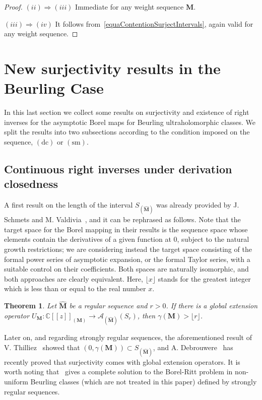 \documentclass[11pt,a4paper]{article}
\theoremstyle{plain}
\newtheorem{theorem}{Theorem}[section]
\theoremstyle{definition}
\numberwithin{equation}{section}
\newcommand{\CC}{\mathbb{C}}
\newcommand{\M}{{\boldsymbol{M}}}
\newcommand{\hM}{\widehat{{\boldsymbol{M}}}}
\def\ga{\gamma}
\newcommand{\dc}{\operatorname{(dc)}}
\newcommand{\sm}{\operatorname{(sm)}}
\begin{document}
\begin{proof}
	$(ii)\Rightarrow (iii)$ Immediate for any weight sequence $\M$.
	
	$(iii)\Rightarrow (iv)$ It follows from~\eqref{equaContentionSurjectIntervals}, again valid for any weight sequence.
\end{proof}

\section{New surjectivity results in the Beurling Case}\label{sect.Improvements.Beurling}

In this last section we collect some results on surjectivity and existence of right inverses for the asymptotic Borel maps for Beurling ultraholomorphic classes. We split the results into two subsections according to the condition imposed on the sequence, $\dc$ or $\sm$.

\subsection{Continuous right inverses under derivation closedness}

A first result on the length of the interval $S_{(\hM)}$ was already provided by J. Schmets and M. Valdivia~\cite[Th. 4.4 and 4.6]{SchmetsValdivia00}, and it can be rephrased as follows.
Note that the target space for the Borel mapping in their results is the sequence space whose elements contain the derivatives of a given function at 0, subject to the natural growth restrictions; we are considering instead the target space consisting of the formal power series of asymptotic expansion, or the formal Taylor series, with a suitable control on their coefficients. Both spaces are naturally isomorphic, and both approaches are clearly equivalent.
Here, $\lfloor x\rfloor$ stands for the greatest integer which is less than or equal to the real number $x$.

\begin{theorem}\label{th.SchmVald.ext.oper.Beurling.implies.gamma}
Let $\hM$ be a regular sequence and $r>0$. If there is a global extension operator $U_{\M}:\CC[[z]]_{(\M)}\to\mathcal{A}_{(\hM)}(S_{r})$, then $\gamma(\M)>\lfloor r\rfloor$.
\end{theorem}

Later on, and regarding strongly regular sequences, the aforementioned result of V. Thilliez~\cite[Cor. 3.4.1]{Thilliez03} showed that $(0,\ga(\M))\subset S_{(\hM)}$, and A. Debrouwere~\cite[Cor. 1.3]{DebrouwereBorelRittBeurlingClasses} has recently proved that surjectivity comes with global extension operators. It is worth noting that~\cite[Th. 1.2]{DebrouwereBorelRittBeurlingClasses} gives a complete solution to the Borel-Ritt problem in non-uniform Beurling classes (which are not treated in this paper) defined by strongly regular sequences.
\end{document}
